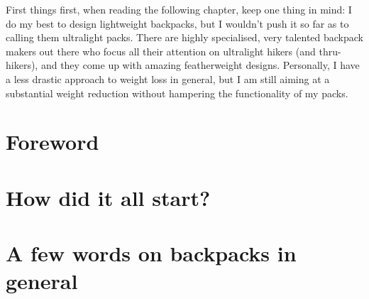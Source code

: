 First things first, when reading the following chapter, keep one thing in mind: I do my best to design lightweight backpacks, but I wouldn't push it so far as to calling them ultralight packs. There are highly specialised, very talented backpack makers out there who focus all their attention on ultralight hikers (and thru-hikers),  and they come up with amazing featherweight designs. Personally, I have a less drastic approach to weight loss in general, but I am still aiming at a substantial weight reduction without hampering the functionality of my packs.

\section{Foreword}


\section{How did it all start?}


\section{A few words on backpacks in general}

